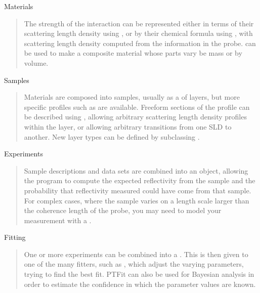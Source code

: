 \documentclass[letterpaper,10pt,english]{sphinxmanual}
\begin{document}
Materials
\begin{quote}

The strength of the interaction can be represented either in
terms of their scattering length density using
{\hyperref[api/material:refl1d.material.SLD]{}}, or by their chemical
formula using {\hyperref[api/material:refl1d.material.Material]{}}, with
scattering length density computed from the information in the
probe.  {\hyperref[api/material:refl1d.material.Mixture]{}} can be used
to make a composite material whose parts vary be mass or by volume.
\end{quote}

Samples
\begin{quote}

Materials are composed into samples, usually as a
{\hyperref[api/model:refl1d.model.Stack]{}} of
{\hyperref[api/model:refl1d.model.Slab]{}} layers, but more specific profiles
such as {\hyperref[api/polymer:refl1d.polymer.PolymerBrush]{}}
are available.  Freeform sections of the profile can be described
using {\hyperref[api/mono:refl1d.mono.FreeLayer]{}}, allowing
arbitrary scattering length density profiles within the layer, or
{\hyperref[api/mono:refl1d.mono.FreeInterface]{}} allowing
arbitrary transitions from one SLD to another.  New layer types
can be defined by subclassing {\hyperref[api/model:refl1d.model.Layer]{}}.
\end{quote}

Experiments
\begin{quote}

Sample descriptions and data sets are combined into an
{\hyperref[api/experiment:refl1d.experiment.Experiment]{}} object,
allowing the program to compute the expected reflectivity
from the sample and the probability that reflectivity measured
could have come from that sample.  For complex cases, where the
sample varies on a length scale larger than the coherence length
of the probe, you may need to model your measurement with a
.
\end{quote}

Fitting
\begin{quote}

One or more experiments can be combined into a
.  This is then
given to one of the many fitters, such as
, which adjust the varying
parameters, trying to find the best fit.  PTFit can also
be used for Bayesian analysis in order to estimate the confidence
in which the parameter values are known.
\end{quote}
\end{document}
